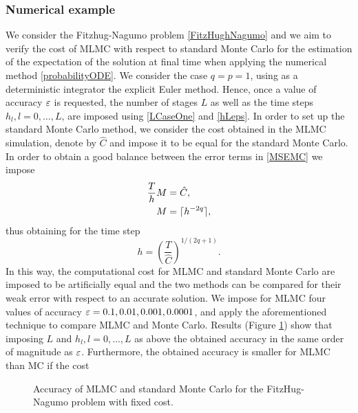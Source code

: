 
\subsubsection{Numerical example}
We consider the Fitzhug-Nagumo problem \eqref{FitzHughNagumo} and we aim to verify the cost of MLMC with respect to standard Monte Carlo for the estimation of the expectation of the solution at final time when applying the numerical method \eqref{probabilityODE}. We consider the case $q = p = 1$, using as a deterministic integrator the explicit Euler method. Hence, once a value of accuracy $\varepsilon$ is requested, the number of stages $L$ as well as the time steps $h_l, l = 0, \ldots, L$, are imposed using \eqref{LCaseOne} and \eqref{hLeps}. In order to set up the standard Monte Carlo method, we consider the cost obtained in the MLMC simulation, denote by $\hat C$ and impose it to be equal for the standard Monte Carlo. In order to obtain a good balance between the error terms in \eqref{MSEMC} we impose
\begin{equation}
\begin{aligned}
	\frac{T}{h} M &= \hat C, \\
	M &= \lceil h^{-2q}\rceil,
\end{aligned}
\end{equation}
thus obtaining for the time step
\begin{equation}
	h = \left(\frac{T}{\hat C}\right)^{1 / (2q + 1)}.
\end{equation}
In this way, the computational cost for MLMC and standard Monte Carlo are imposed to be artificially equal and the two methods can be compared for their weak error with respect to an accurate solution. We impose for MLMC four values of accuracy $\varepsilon = 0.1, 0.01, 0.001, 0.0001$, and apply the aforementioned technique to compare MLMC and Monte Carlo. Results (Figure \ref{fig:MLMCpractice}) show that imposing $L$ and $h_l, l = 0, \ldots, L$ as above the obtained accuracy in the same order of magnitude as $\varepsilon$. Furthermore, the obtained accuracy is smaller for MLMC than MC if the cost 

\begin{figure}
	\centering
	\resizebox{0.6\linewidth}{!}{}
	\caption{Accuracy of MLMC and standard Monte Carlo for the FitzHug-Nagumo problem with fixed cost.}
	\label{fig:MLMCpractice}
\end{figure}